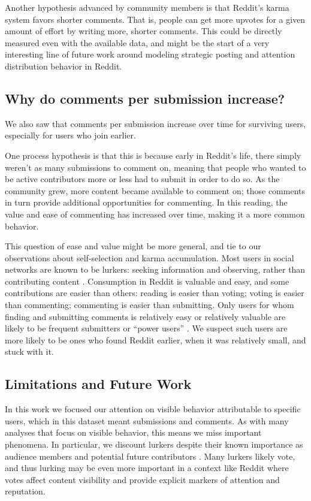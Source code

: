 Another hypothesis advanced by community members\cite{RedditHypo1} is that Reddit's karma system favors shorter comments.  That is, people can get more upvotes for a given amount of effort by writing more, shorter comments.  This could be directly measured even with the available data, and might be the start of a very interesting line of future work around modeling strategic posting and attention distribution behavior in Reddit. 

\subsection{Why do comments per submission increase?}

We also saw that comments per submission increase over time for surviving users, especially for users who join earlier.

One process hypothesis is that this is because early in Reddit's life, there simply weren't as many submissions to comment on, meaning that people who wanted to be active contributors more or less had to submit in order to do so. 
As the community grew, more content became available to comment on; those comments in turn provide additional opportunities for commenting.  In this reading, the value and ease of commenting has increased over time, making it a more common behavior. 

This question of ease and value might be more general, and tie to our observations about self-selection and karma accumulation.  Most users in social networks are known to be lurkers: seeking information and observing, rather than contributing content \cite{Rafaeli2004, Nonnecke2000}. Consumption in Reddit is valuable and easy, and some contributions are easier than others: reading is easier than voting; voting is easier than commenting; commenting is easier than submitting.  Only users for whom finding and submitting comments is relatively easy or relatively valuable are likely to be frequent submitters or ``power users'' \cite{Panciera2009, Kittur2007}. We suspect such users are more likely to be ones who found Reddit earlier, when it was relatively small, and stuck with it.

\subsection{Limitations and Future Work}

In this work we focused our attention on visible behavior attributable to specific users, which in this dataset meant submissions and comments.  As with many analyses that focus on visible behavior, this means we miss important phenomena.  In particular, we discount lurkers despite their known importance as audience members \cite{Nonnecke2003} and potential future contributors \cite{Ridings2006}.  Many lurkers likely vote, and thus lurking may be even more important in a context like Reddit where votes affect content visibility and provide explicit markers of attention and reputation.  

